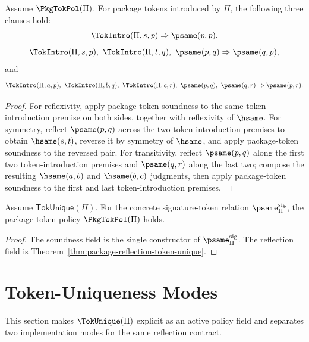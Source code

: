 \begin{corollary}
\label{cor:package-token-policy-introduced-closure}
Assume $\PkgTokPol(\Pi)$. For package tokens introduced by $\Pi$, the following three clauses hold:
$$
\TokIntro(\Pi,s,p) \Rightarrow \psame(p,p),
$$
$$
\TokIntro(\Pi,s,p),\ \TokIntro(\Pi,t,q),\ \psame(p,q) \Rightarrow \psame(q,p),
$$
and
$$
\TokIntro(\Pi,a,p),\ \TokIntro(\Pi,b,q),\ \TokIntro(\Pi,c,r),\ \psame(p,q),\ \psame(q,r) \Rightarrow \psame(p,r).
$$
\end{corollary}

\begin{proof}
For reflexivity, apply package-token soundness to the same token-introduction premise on both sides, together with reflexivity of $\hsame$. For symmetry, reflect $\psame(p,q)$ across the two token-introduction premises to obtain $\hsame(s,t)$, reverse it by symmetry of $\hsame$, and apply package-token soundness to the reversed pair. For transitivity, reflect $\psame(p,q)$ along the first two token-introduction premises and $\psame(q,r)$ along the last two; compose the resulting $\hsame(a,b)$ and $\hsame(b,c)$ judgments, then apply package-token soundness to the first and last token-introduction premises.
\end{proof}

\begin{theorem}
\label{thm:package-token-policy-from-token-unique}
Assume $\mathsf{TokUnique}(\Pi)$. For the concrete signature-token relation $\psame_{\Pi}^{\mathrm{sig}}$, the package token policy $\PkgTokPol(\Pi)$ holds.
\end{theorem}

\begin{proof}
The soundness field is the single constructor of $\psame_{\Pi}^{\mathrm{sig}}$. The reflection field is Theorem~\ref{thm:package-reflection-token-unique}.
\end{proof}

\section{Token-Uniqueness Modes}
\label{sec:po-token-uniqueness-modes}

This section makes \(\TokUnique(\Pi)\) explicit as an active policy field and separates two implementation modes for the same reflection contract.

